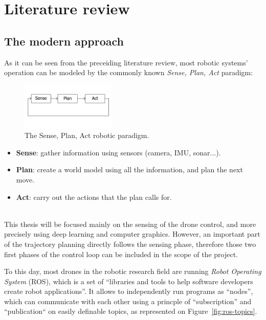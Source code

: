 \section{Literature review}


\subsection{The modern approach}
As it can be seen from the preceiding literature review, most robotic systems'
operation can be modeled by the commonly known \emph{Sense, Plan, Act}
paradigm:

\begin{figure}[h]
	\centering
	\includegraphics[width=0.4\textwidth]{figure/robotic_paradigm.png}
	\caption{The Sense, Plan, Act robotic paradigm.}
	\label{fig:robotic_paradigm}
\end{figure}

\begin{itemize}
	\item{\textbf{Sense}}: gather information using sensors (camera, IMU, sonar...).
	\item{\textbf{Plan}}: create a world model using all the information, and plan
		the next move.
	\item{\textbf{Act}}: carry out the actions that the plan calls for.
\end{itemize}

~\\
This thesis will be focused mainly on the sensing of the drone control, and
more precisely using deep learning and computer graphics. However, an important
part of the trajectory planning directly follows the sensing phase, therefore
those two first phases of the control loop can be included in the scope of the
project.

To this day, most drones in the robotic research field are running \emph{Robot
Operating System} (ROS),  which is a set of ``libraries and
tools to help software developers create robot applications''. It allows to
independently run programs as ``nodes'', which can communicate with each other
using a princple of ``subscription'' and ``publication`` on easily definable
topics, as represented on Figure~\ref{fig:ros-topics}.

